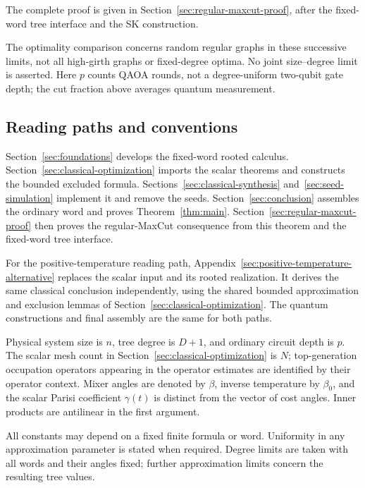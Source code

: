 The complete proof is given in Section~\ref{sec:regular-maxcut-proof},
after the fixed-word tree interface and the SK construction.

The optimality comparison concerns random regular graphs in these
successive limits, not all high-girth graphs or fixed-degree optima.
No joint size--degree limit is asserted. Here $p$ counts QAOA rounds,
not a degree-uniform two-qubit gate depth; the cut fraction above
averages quantum measurement.

\subsection{Reading paths and conventions}

Section~\ref{sec:foundations} develops the fixed-word rooted
calculus. Section~\ref{sec:classical-optimization} imports the scalar
theorems and constructs the bounded excluded formula.
Sections~\ref{sec:classical-synthesis} and~\ref{sec:seed-simulation}
implement it and remove the seeds. Section~\ref{sec:conclusion}
assembles the ordinary word and proves Theorem~\ref{thm:main}.
Section~\ref{sec:regular-maxcut-proof} then proves the regular-MaxCut
consequence from this theorem and the fixed-word tree interface.

For the positive-temperature reading path,
Appendix~\ref{sec:positive-temperature-alternative} replaces the
scalar input and its rooted realization. It derives the same
classical conclusion independently, using the shared bounded
approximation and exclusion lemmas of
Section~\ref{sec:classical-optimization}. The quantum constructions
and final assembly are the same for both paths.

Physical system size is $n$, tree degree is $D+1$, and ordinary
circuit depth is $p$. The scalar mesh count in
Section~\ref{sec:classical-optimization} is $N$; top-generation
occupation operators appearing in the operator estimates are
identified by their operator context. Mixer angles are denoted by
$\beta$, inverse temperature by $\beta_0$, and the scalar Parisi
coefficient $\gamma(t)$ is distinct from the vector of cost angles.
Inner products are antilinear in the first argument.

All constants may depend on a fixed finite formula or word.
Uniformity in any approximation parameter is stated when required.
Degree limits are taken with all words and their angles fixed;
further approximation limits concern the resulting tree values.
